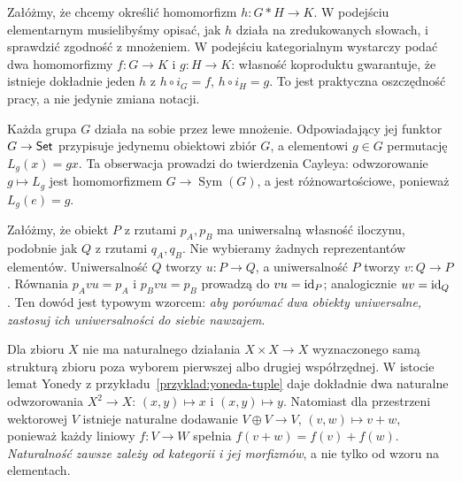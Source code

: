 \begin{przyklad}
Załóżmy, że chcemy określić homomorfizm $h:G*H\to K$. W podejściu elementarnym musielibyśmy opisać, jak $h$ działa na zredukowanych słowach, i sprawdzić zgodność z mnożeniem. W podejściu kategorialnym wystarczy podać dwa homomorfizmy $f:G\to K$ i $g:H\to K$: własność koproduktu gwarantuje, że istnieje dokładnie jeden $h$ z $h\circ i_G=f$, $h\circ i_H=g$. To jest praktyczna oszczędność pracy, a nie jedynie zmiana notacji.
\end{przyklad}

\begin{przyklad}
Każda grupa $G$ działa na sobie przez lewe mnożenie. Odpowiadający jej funktor $G\to\mathsf{Set}$ przypisuje jedynemu obiektowi zbiór $G$, a elementowi $g\in G$ permutację $L_g(x)=gx$. Ta obserwacja prowadzi do twierdzenia Cayleya: odwzorowanie $g\mapsto L_g$ jest homomorfizmem $G\to\operatorname{Sym}(G)$, a jest różnowartościowe, ponieważ $L_g(e)=g$.
\end{przyklad}


\begin{przyklad}
Załóżmy, że obiekt $P$ z rzutami $p_A,p_B$ ma uniwersalną własność iloczynu, podobnie jak $Q$ z rzutami $q_A,q_B$. Nie wybieramy żadnych reprezentantów elementów. Uniwersalność $Q$ tworzy $u:P\to Q$, a uniwersalność $P$ tworzy $v:Q\to P$. Równania $p_Avu=p_A$ i $p_Bvu=p_B$ prowadzą do $vu=\mathrm{id}_P$; analogicznie $uv=\mathrm{id}_Q$. Ten dowód jest typowym wzorcem: \emph{aby porównać dwa obiekty uniwersalne, zastosuj ich uniwersalności do siebie nawzajem}.
\end{przyklad}

\begin{przyklad}
Dla zbioru $X$ nie ma naturalnego działania $X\times X\to X$ wyznaczonego samą strukturą zbioru poza wyborem pierwszej albo drugiej współrzędnej. W istocie lemat Yonedy z przykładu~\ref{przyklad:yoneda-tuple} daje dokładnie dwa naturalne odwzorowania $X^2\to X$: $(x,y)\mapsto x$ i $(x,y)\mapsto y$. Natomiast dla przestrzeni wektorowej $V$ istnieje naturalne dodawanie $V\oplus V\to V$, $(v,w)\mapsto v+w$, ponieważ każdy liniowy $f:V\to W$ spełnia $f(v+w)=f(v)+f(w)$. \emph{Naturalność zawsze zależy od kategorii i jej morfizmów}, a nie tylko od wzoru na elementach.
\end{przyklad}


